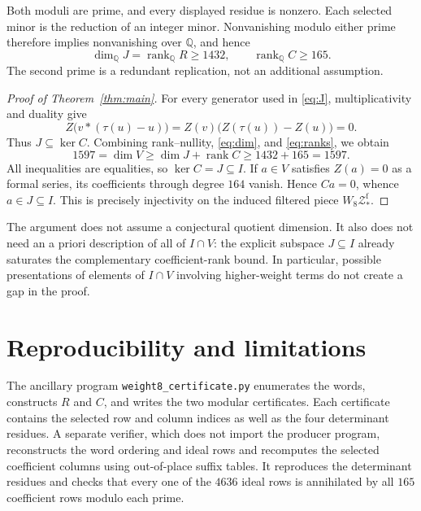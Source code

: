 \documentclass[11pt]{article}
\newcommand{\Q}{\mathbb{Q}}
\newcommand{\Zf}{\mathcal{Z}^{\mathrm f}_*}
\begin{document}
Both moduli are prime, and every displayed residue is nonzero.  Each selected
minor is the reduction of an integer minor.  Nonvanishing modulo either prime
therefore implies nonvanishing over \(\Q\), and hence
\begin{equation}\label{eq:ranks}
 \dim_{\Q}J=\operatorname{rank}_{\Q}R\geq1432,
 \qquad \operatorname{rank}_{\Q}C\geq165.
\end{equation}
The second prime is a redundant replication, not an additional assumption.

\begin{proof}[Proof of Theorem~\ref{thm:main}]
For every generator used in \eqref{eq:J}, multiplicativity and duality give
\[
 Z\bigl(v*(\tau(u)-u)\bigr)
 =Z(v)\bigl(Z(\tau(u))-Z(u)\bigr)=0.
\]
Thus \(J\subseteq\ker C\).  Combining rank--nullity,
\eqref{eq:dim}, and \eqref{eq:ranks}, we obtain
\[
 1597=\dim V
 \geq \dim J+\operatorname{rank}C
 \geq1432+165=1597.
\]
All inequalities are equalities, so \(\ker C=J\subseteq I\).  If
\(a\in V\) satisfies \(Z(a)=0\) as a formal series, its coefficients through
degree \(164\) vanish.  Hence \(Ca=0\), whence \(a\in J\subseteq I\).
This is precisely injectivity on the induced filtered piece \(W_8\Zf\).
\end{proof}

The argument does not assume a conjectural quotient dimension.  It also does
not need an a priori description of all of \(I\cap V\): the explicit subspace
\(J\subseteq I\) already saturates the complementary coefficient-rank bound.
In particular, possible presentations of elements of \(I\cap V\) involving
higher-weight terms do not create a gap in the proof.

\section{Reproducibility and limitations}

The ancillary program \texttt{weight8\_certificate.py} enumerates the words,
constructs \(R\) and \(C\), and writes the two modular certificates.  Each
certificate contains the selected row and column indices as well as the four
determinant residues.  A separate verifier, which does not import the producer
program, reconstructs the word ordering and ideal rows and recomputes the
selected coefficient columns using out-of-place suffix tables.  It reproduces
the determinant residues and checks that every one of the \(4636\) ideal rows
is annihilated by all \(165\) coefficient rows modulo each prime.
\end{document}

